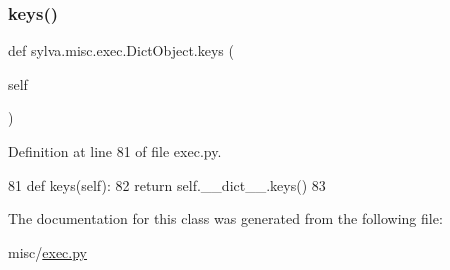 \subsubsection{\texorpdfstring{keys()}{keys()}}
{\footnotesize\ttfamily def sylva.\+misc.\+exec.\+Dict\+Object.\+keys (\begin{DoxyParamCaption}\item[{}]{self }\end{DoxyParamCaption})}



Definition at line 81 of file exec.\+py.


\begin{DoxyCode}
81   \textcolor{keyword}{def }keys(self):
82     \textcolor{keywordflow}{return} self.\_\_dict\_\_.keys()
83 
\end{DoxyCode}


The documentation for this class was generated from the following file\+:\begin{DoxyCompactItemize}
\item 
misc/\hyperlink{exec_8py}{exec.\+py}\end{DoxyCompactItemize}
